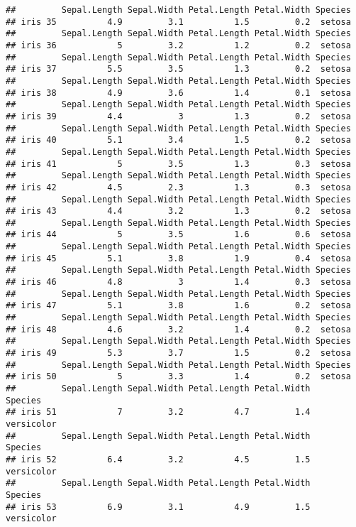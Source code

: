 \documentclass[
]{article}
\begin{document}
\begin{verbatim}
##         Sepal.Length Sepal.Width Petal.Length Petal.Width Species
## iris 35          4.9         3.1          1.5         0.2  setosa
##         Sepal.Length Sepal.Width Petal.Length Petal.Width Species
## iris 36            5         3.2          1.2         0.2  setosa
##         Sepal.Length Sepal.Width Petal.Length Petal.Width Species
## iris 37          5.5         3.5          1.3         0.2  setosa
##         Sepal.Length Sepal.Width Petal.Length Petal.Width Species
## iris 38          4.9         3.6          1.4         0.1  setosa
##         Sepal.Length Sepal.Width Petal.Length Petal.Width Species
## iris 39          4.4           3          1.3         0.2  setosa
##         Sepal.Length Sepal.Width Petal.Length Petal.Width Species
## iris 40          5.1         3.4          1.5         0.2  setosa
##         Sepal.Length Sepal.Width Petal.Length Petal.Width Species
## iris 41            5         3.5          1.3         0.3  setosa
##         Sepal.Length Sepal.Width Petal.Length Petal.Width Species
## iris 42          4.5         2.3          1.3         0.3  setosa
##         Sepal.Length Sepal.Width Petal.Length Petal.Width Species
## iris 43          4.4         3.2          1.3         0.2  setosa
##         Sepal.Length Sepal.Width Petal.Length Petal.Width Species
## iris 44            5         3.5          1.6         0.6  setosa
##         Sepal.Length Sepal.Width Petal.Length Petal.Width Species
## iris 45          5.1         3.8          1.9         0.4  setosa
##         Sepal.Length Sepal.Width Petal.Length Petal.Width Species
## iris 46          4.8           3          1.4         0.3  setosa
##         Sepal.Length Sepal.Width Petal.Length Petal.Width Species
## iris 47          5.1         3.8          1.6         0.2  setosa
##         Sepal.Length Sepal.Width Petal.Length Petal.Width Species
## iris 48          4.6         3.2          1.4         0.2  setosa
##         Sepal.Length Sepal.Width Petal.Length Petal.Width Species
## iris 49          5.3         3.7          1.5         0.2  setosa
##         Sepal.Length Sepal.Width Petal.Length Petal.Width Species
## iris 50            5         3.3          1.4         0.2  setosa
##         Sepal.Length Sepal.Width Petal.Length Petal.Width    Species
## iris 51            7         3.2          4.7         1.4 versicolor
##         Sepal.Length Sepal.Width Petal.Length Petal.Width    Species
## iris 52          6.4         3.2          4.5         1.5 versicolor
##         Sepal.Length Sepal.Width Petal.Length Petal.Width    Species
## iris 53          6.9         3.1          4.9         1.5 versicolor

\end{verbatim}
\end{document}
